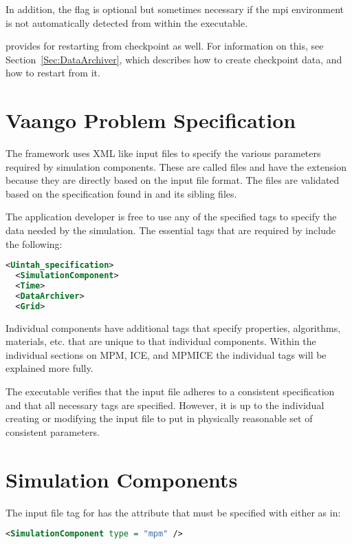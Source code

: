 In addition, the  flag is optional but sometimes
necessary if the mpi environment is not automatically detected from
within the  executable.

\Vaango provides for restarting from checkpoint as well.  For information on
this, see Section~\ref{Sec:DataArchiver}, which describes how to create
checkpoint data, and how to restart from it.

\section{Vaango Problem Specification} \label{Sec:UPS}
The \Vaango framework uses XML like input files to specify the various
parameters required by simulation components.  These are called
 files and have the extension 
because they are directly based on the \Uintah input file format.
The  files are validated based on the specification
found in 
and its sibling files.  

The application developer is free to use any of the specified tags to
specify the data needed by the simulation.  The essential tags that
are required by \Vaango include the following:
\begin{lstlisting}[language=XML]
  <Uintah_specification>
  <SimulationComponent>
  <Time>
  <DataArchiver>
  <Grid>
\end{lstlisting}

Individual components have additional tags that specify properties,
algorithms, materials, etc. that are unique to that individual
components.  Within the individual sections on MPM, ICE, and MPMICE
the individual tags will be explained more fully.

The  executable verifies that the input file adheres to a consistent
specification and that all necessary tags are specified.  However, it
is up to the individual creating or modifying the input file to put in
physically reasonable set of consistent parameters.

\section{Simulation Components} \label{Sec:SimulationComponent}
The input file tag for  has the 
attribute that must be specified with either 
as in:
\begin{lstlisting}[language=XML]
<SimulationComponent type = "mpm" />
\end{lstlisting}

